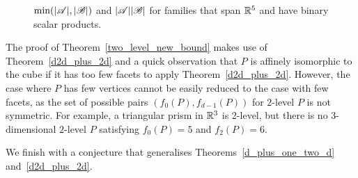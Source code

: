 \begin{figure}[!h]
\centering
{}
\caption{$\operatorname{min}(|{\mathscr{A}}|, |{\mathscr{B}}|)$ and $|{\mathscr{A}}||{\mathscr{B}}|$ for families that span ${\mathbb{R}}^5$ and have binary scalar products.}
\label{pos-Min-Prod-Plot}
\end{figure}


The proof of Theorem~\ref{two_level_new_bound} makes use of Theorem~\ref{d2d_plus_2d} and a quick observation that $P$ is affinely isomorphic to the cube if it has too few facets to apply Theorem~\ref{d2d_plus_2d}. However, the case where $P$ has few vertices cannot be easily reduced to the case with few facets, as the set of possible pairs $\left(f_0(P), f_{d-1}(P)\right)$ for $2$-level $P$ is not symmetric. For example, a triangular prism in ${\mathbb{R}}^3$ is $2$-level, but there is no $3$-dimensional $2$-level $P$ satisfying $f_0(P)=5$ and $f_2(P)=6$.

\noindent We finish with  a conjecture that generalises Theorems~\ref{d_plus_one_two_d} and~\ref{d2d_plus_2d}.


